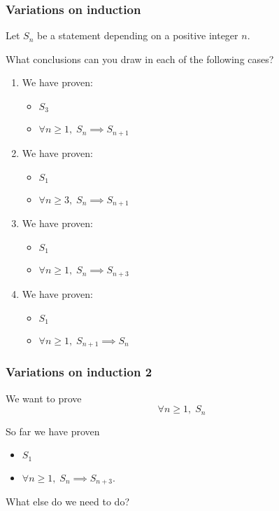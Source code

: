 \documentclass[14pt]{beamer}
\newcommand {\DS} [1] {${\displaystyle #1}$}
\begin{document}
\begin{frame}
\frametitle{Variations on induction}

Let $S_n$ be a statement depending on a positive integer $n$.

\vfill  

What conclusions can you draw in each of the following cases?

\vfill 

\begin{multicols}{2}
\begin{enumerate}
\item  We have proven:
	\begin{itemize}
		\item   $S_3$ 
		\item  \DS{\forall n \geq 1, \; S_{n}  \implies S_{n+1} }
	\end{itemize}	
\item  We have proven:
	\begin{itemize}
		\item  $S_1$ 
		\item  \DS{\forall n \geq 3, \; S_{n} \implies S_{n+1} }
	\end{itemize}	
\item  We have proven:
	\begin{itemize}
		\item  $S_1$ 
		\item  \DS{\forall n \geq 1, \; S_{n} \implies S_{n+3} }
	\end{itemize}	
\item  We have proven:
	\begin{itemize}
		\item  $S_1$ 
		\item  \DS{\forall n \geq 1, \; S_{n+1}  \implies S_{n} }
	\end{itemize}	
\end{enumerate}	
\end{multicols}

\vfill

\end{frame}


\begin{frame}
\frametitle{Variations on induction 2}

We want to prove  
	$$\forall n \geq 1, \; S_n $$
	
\vfill

So far we have proven
	\begin{itemize}
		\item  $S_1$ 
		\item  \DS{\forall n \geq 1, \; S_n \implies S_{n+3}.}
	\end{itemize}	

\vfill	

What else do we need to do?

\end{frame}
\end{document}
